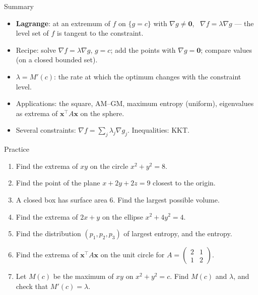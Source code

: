 \documentclass[10pt]{wosm-slides}
\newcommand{\vx}{\mathbf{x}}
\begin{document}
\begin{frame}{Summary}
  \begin{itemize}
    \item \textbf{Lagrange}: at an extremum of $f$ on $\{g = c\}$ with $\nabla g \ne \mathbf 0$, \
      $\nabla f = \lambda\nabla g$ --- the level set of $f$ is tangent to the constraint.
    \item Recipe: solve $\nabla f = \lambda\nabla g$, $g = c$; add the points with $\nabla g = \mathbf 0$;
      compare values (on a closed bounded set).
    \item $\lambda = M'(c)$: the rate at which the optimum changes with the constraint level.
    \item Applications: the square, AM--GM, maximum entropy (uniform), eigenvalues as extrema
      of $\vx^\top A\vx$ on the sphere.
    \item Several constraints: $\nabla f = \sum_j \lambda_j\nabla g_j$. Inequalities: KKT.
  \end{itemize}
\end{frame}

\begin{frame}{Practice}
  \small
  \begin{enumerate}
    \item Find the extrema of $xy$ on the circle $x^2 + y^2 = 8$.
    \item Find the point of the plane $x + 2y + 2z = 9$ closest to the origin.
    \item A closed box has surface area $6$. Find the largest possible volume.
    \item Find the extrema of $2x + y$ on the ellipse $x^2 + 4y^2 = 4$.
    \item Find the distribution $(p_1, p_2, p_3)$ of largest entropy, and the entropy.
    \item Find the extrema of $\vx^\top A\vx$ on the unit circle for
      $A = \begin{pmatrix} 2 & 1 \\ 1 & 2 \end{pmatrix}$.
    \item Let $M(c)$ be the maximum of $xy$ on $x^2 + y^2 = c$. Find $M(c)$ and $\lambda$, and check
      that $M'(c) = \lambda$.
  \end{enumerate}
\end{frame}
\end{document}
